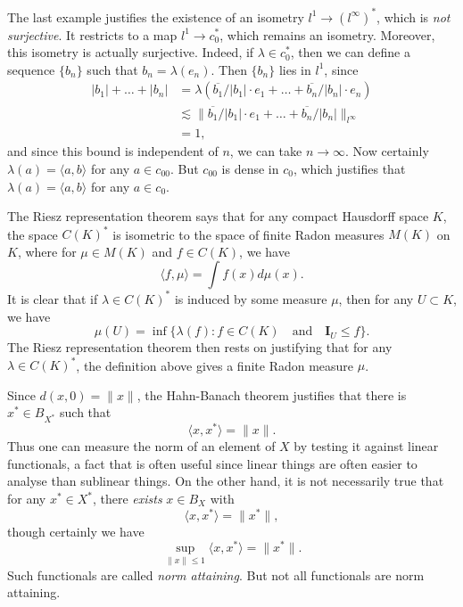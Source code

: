 \begin{example}
    The last example justifies the existence of an isometry $l^1 \to (l^\infty)^*$, which is \emph{not surjective}. It restricts to a map $l^1 \to c_0^*$, which remains an isometry. Moreover, this isometry is actually surjective. Indeed, if $\lambda \in c_0^*$, then we can define a sequence $\{ b_n \}$ such that $b_n = \lambda(e_n)$. Then $\{ b_n \}$ lies in $l^1$, since
    \begin{align*}
        |b_1| + \dots + |b_n| &= \lambda \left( \overline{b_1} / |b_1| \cdot e_1 + \dots + \overline{b_n} / |b_n| \cdot e_n \right)\\
        &\lesssim \| \overline{b_1} / |b_1| \cdot e_1 + \dots + \overline{b_n} / |b_n| \|_{l^\infty}\\
        &= 1,
    \end{align*}
    and since this bound is independent of $n$, we can take $n \to \infty$. Now certainly $\lambda(a) = \langle a, b \rangle$ for any $a \in c_{00}$. But $c_{00}$ is dense in $c_0$, which justifies that $\lambda(a) = \langle a, b \rangle$ for any $a \in c_0$.
\end{example}

\begin{example}
    The Riesz representation theorem says that for any compact Hausdorff space $K$, the space $C(K)^*$ is isometric to the space of finite Radon measures $M(K)$ on $K$, where for $\mu \in M(K)$ and $f \in C(K)$, we have
    \[ \langle f, \mu \rangle = \int f(x) d\mu(x). \]
    It is clear that if $\lambda \in C(K)^*$ is induced by some measure $\mu$, then for any $U \subset K$, we have
    \[ \mu(U) = \inf \{ \lambda(f): f \in C(K) \quad\text{and}\quad \mathbf{I}_U \leq f \}. \]
    The Riesz representation theorem then rests on justifying that for any $\lambda \in C(K)^*$, the definition above gives a finite Radon measure $\mu$.
\end{example}

Since $d(x,0) = \| x \|$, the Hahn-Banach theorem justifies that there is $x^* \in B_{X^*}$ such that
%
\[ \langle x, x^* \rangle = \| x \|. \]
%
Thus one can measure the norm of an element of $X$ by testing it against linear functionals, a fact that is often useful since linear things are often easier to analyse than sublinear things. On the other hand, it is not necessarily true that for any $x^* \in X^*$, there \emph{exists} $x \in B_X$ with
%
\[ \langle x, x^* \rangle = \| x^* \|, \]
%
though certainly we have
%
\[ \sup_{\| x \| \leq 1} \langle x, x^* \rangle = \| x^* \|. \]
%
Such functionals are called \emph{norm attaining}. But not all functionals are norm attaining.

